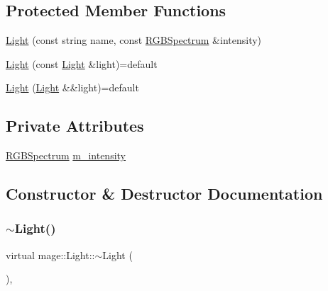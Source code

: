 \subsection*{Protected Member Functions}
\begin{DoxyCompactItemize}
\item 
\hyperlink{classmage_1_1_light_a4baab945e12b921c599bbf77c3bd208e}{Light} (const string name, const \hyperlink{structmage_1_1_r_g_b_spectrum}{R\+G\+B\+Spectrum} \&intensity)
\item 
\hyperlink{classmage_1_1_light_a334de10c1d8939b53e2193c08b67fe88}{Light} (const \hyperlink{classmage_1_1_light}{Light} \&light)=default
\item 
\hyperlink{classmage_1_1_light_ad9d33c6249383fd0c7e58f97ff04eee8}{Light} (\hyperlink{classmage_1_1_light}{Light} \&\&light)=default
\end{DoxyCompactItemize}
\subsection*{Private Attributes}
\begin{DoxyCompactItemize}
\item 
\hyperlink{structmage_1_1_r_g_b_spectrum}{R\+G\+B\+Spectrum} \hyperlink{classmage_1_1_light_a4ed8d43c8a4df71671a922d5f04974b8}{m\+\_\+intensity}
\end{DoxyCompactItemize}


\subsection{Constructor \& Destructor Documentation}
\hypertarget{classmage_1_1_light_a56971b15195b704f8c251bae766625ac}{}\label{classmage_1_1_light_a56971b15195b704f8c251bae766625ac} 
\subsubsection{\texorpdfstring{$\sim$\+Light()}{~Light()}}
{\footnotesize\ttfamily virtual mage\+::\+Light\+::$\sim$\+Light (\begin{DoxyParamCaption}{ }\end{DoxyParamCaption})\hspace{0.3cm}{\ttfamily [virtual]}, {\ttfamily [default]}}

\hypertarget{classmage_1_1_light_a4baab945e12b921c599bbf77c3bd208e}{}\label{classmage_1_1_light_a4baab945e12b921c599bbf77c3bd208e} 
